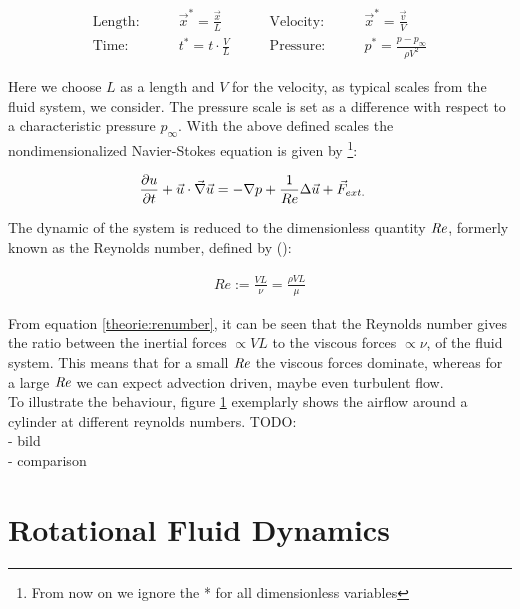 \begin{align}
    \text{Length:}\qquad &  \vec{x}^* = \frac{\vec{x}}{L}  & \qquad \text{Velocity:}\qquad& \vec{x}^* = \frac{\vec{v}}{V}\\
    \text{Time:}  \qquad & t^* = t \cdot \frac{V}{L}      & \qquad  \text{Pressure:}\qquad & p^* = \frac{p - p_\infty}{\rho V^2}
\end{align}

Here we choose $L$ as a length and $V$ for the velocity, as typical scales from the fluid system, we consider.
The pressure scale is set as a difference with respect to a characteristic pressure $p_\infty$.
With the above defined scales the nondimensionalized Navier-Stokes equation is given by \footnote{
From now on we ignore the * for all dimensionless variables }:

\begin{align}
    \pdn[u]{t} + \vec{u} \cdot \vec{\nabla} \vec{u} &= -\nabla p + \frac{1}{Re} \Delta \vec{u} + \vec{F}_{ext.}
\end{align}

The dynamic of the system is reduced to the dimensionless quantity $\Rey$, formerly known as the Reynolds number,
defined by (\citep{Kundu2012}):

\begin{align}
    \label{theorie:renumber}
    Re := \frac{VL}{\nu} = \frac{\rho VL}{\mu}
\end{align}

\newpage

From equation \ref{theorie:renumber}, it can be seen that the Reynolds number gives the ratio between the inertial forces $\propto VL$
to the viscous forces $\propto \nu$, of the fluid system.
This means that for a small $\Rey$ the viscous forces dominate, whereas for a large $\Rey$ we can expect advection driven, maybe even turbulent flow.\\
To illustrate the behaviour, figure \ref{theorie:re_example} exemplarly shows the airflow around a cylinder at different reynolds numbers.
TODO:\\
- bild\\
- comparison\\

\begin{figure}[!pb]
    \label{theorie:re_example}
  \centering
\end{figure}
\newpage

\section{Rotational Fluid Dynamics}

